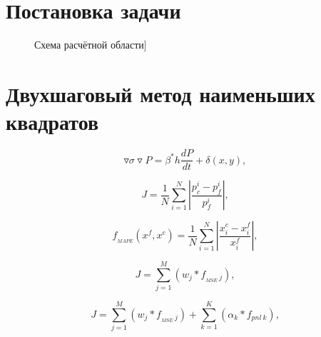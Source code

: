 \documentclass[14pt]{article}
\begin{document}
\section{Постановка задачи}
\begin{figure}
	\caption{Схема расчётной области]}
	\label{fig:map}
\end{figure}

	\section{Двухшаговый метод наименьших квадратов}
\begin{equation} \label{fil}
	\triangledown\sigma\triangledown P = \beta^*h\frac{dP}{dt}+\delta(x,y),
\end{equation}

\begin{equation} \label{mape}
	J=\frac{1}{N}\sum_{i=1}^N{\left\vert\frac{p_c^i-p_f^i}{p_f^i}\right\vert},
\end{equation}

\begin{equation} \label{mape}
	f_{_{MAPE}}(x^f,x^c)=\frac{1}{N}\sum_{i=1}^N{\left\vert\frac{x_i^c-x_i^f}{x_i^f}\right\vert},
\end{equation}

\begin{equation} \label{mape}
	J=\sum_{j=1}^M \left( w_j*f_{_{MSE} \ j} \right),
\end{equation}

\begin{equation} \label{mape}
	J=\sum_{j=1}^M \left( w_j*f_{_{MSE} \ j} \right) + \sum_{k=1}^K \left( \alpha_k * f_{pnl \ k}\right),
\end{equation}
\end{document}
